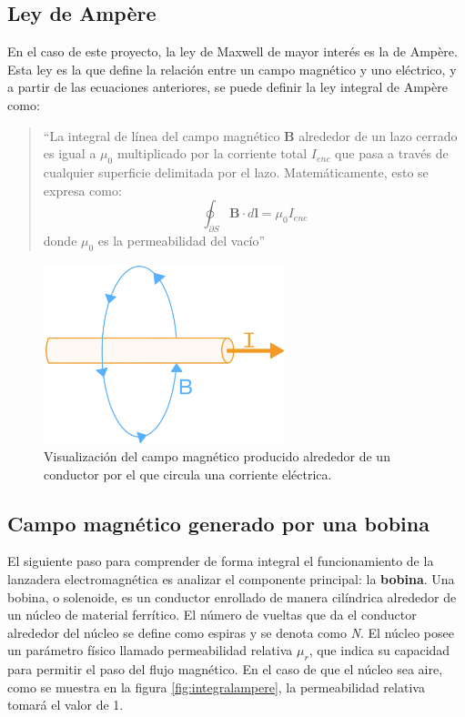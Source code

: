 \subsection{Ley de Ampère}

En el caso de este proyecto, la ley de Maxwell de mayor interés es la de Ampère. Esta ley es la que define la relación entre un campo magnético y uno eléctrico, y a partir de las ecuaciones anteriores, se puede definir la ley integral de Ampère como:

\begin{quote}
    ``La integral de línea del campo magnético \(\mathbf{B}\) alrededor de un lazo cerrado es igual a \(\mu_0\) multiplicado por la corriente total \(I_{enc}\) que pasa a través de cualquier superficie delimitada por el lazo. Matemáticamente, esto se expresa como:
    \[
    \oint_{\partial S} \mathbf{B} \cdot d\mathbf{l} = \mu_0 I_{enc}
    \]
    donde \(\mu_0\) es la permeabilidad del vacío''
\end{quote}

\begin{figure}[H]
    \centering %
    \includegraphics[width=7cm]{FigurasMemoria/amperelaw.jpg}
    \caption{Visualización del campo magnético producido alrededor de un conductor por el que circula una corriente eléctrica.}
    \label{fig:amperelaw} %
\end{figure}

\subsection{Campo magnético generado por una bobina}

El siguiente paso para comprender de forma integral el funcionamiento de la lanzadera electromagnética es analizar el componente principal: la \textbf{bobina}. Una bobina, o solenoide, es un conductor enrollado de manera cilíndrica alrededor de un núcleo de material ferrítico. El número de vueltas que da el conductor alrededor del núcleo se define como espiras y se denota como \textit{N}. El núcleo posee un parámetro físico llamado permeabilidad relativa \(\mu_r\), que indica su capacidad para permitir el paso del flujo magnético. En el caso de que el núcleo sea aire, como se muestra en la figura \ref{fig:integralampere}, la permeabilidad relativa tomará el valor de 1.

